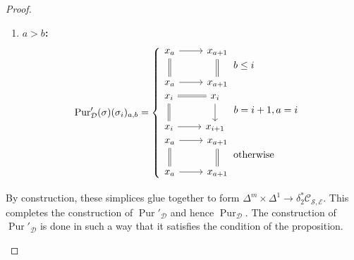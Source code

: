 \documentclass[14pt]{article}
\theoremstyle{definition}
\newcommand{\E}{\mathcal{E}}
\newcommand{\D}{\mathcal{D}}
\newcommand{\op}[1]{\operatorname{#1}}
\renewcommand{\S}{\mathcal{S}}
\newcommand{\dd}{\delta}
\newcommand{\Ca}{\mathcal{C}}
\numberwithin{subsection}{section}
\begin{document}
\begin{proof}
\begin{enumerate}
\begin{enumerate}
\begin{equation}
       \end{equation}
       \item \textbf{$a>b$:}
        \begin{equation}
       \op{Pur}'_{\D}(\sigma)(\sigma_i)_{a,b}=\begin{cases}
              \begin{tikzcd}
               x_a \arrow[r] \arrow[d,equal] & x_{a+1} \arrow[d,equal] \\
               x_{a} \arrow[r] & x_{a+1}
           \end{tikzcd} \, b\leq i \\ 
            \begin{tikzcd}
               x_i \arrow[r,equal] \arrow[d,equal] & x_{i} \arrow[d] \\
               x_i \arrow[r] & x_{i+1}
           \end{tikzcd} \,\,\, b=i+1,a=i\\
           \begin{tikzcd}
               x_a \arrow[r] \arrow[d,equal] & x_{a+1} \arrow[d,equal] \\
               x_{a} \arrow[r] & x_{a+1}
           \end{tikzcd} \, \text{otherwise}
       \end{cases}
   \end{equation}
   
\end{enumerate}
By construction, these simplices glue together to form $\Delta^m \times \Delta^1 \to \dd^*_2\Ca_{\S,\E}$. This completes the construction of $\op{Pur}'_{\D}$ and hence $\op{Pur}_{\D}$. The construction of $\op{Pur}'_{\D}$ is done in such a way that it satisfies the condition of the proposition. 
\end{enumerate}
    
\end{proof}
\end{document}
